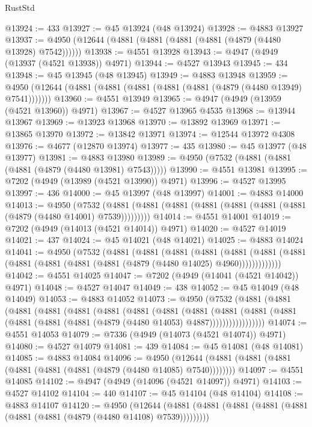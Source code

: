 \begin{lexlean}{RustStd}
\begin{coremodule}
@13924 := 433
@13927 := @45 @13924 (@48 @13924)
@13928 := @4883 @13927
@13937 := @4950 (@12644 (@4881 (@4881 (@4881 (@4881 (@4879 (@4480 @13928) @7542))))))
@13938 := @4551 @13928
@13943 := @4947 (@4949 (@13937 (@4521 @13938)) @4971)
@13944 := @4527 @13943
@13945 := 434
@13948 := @45 @13945 (@48 @13945)
@13949 := @4883 @13948
@13959 := @4950 (@12644 (@4881 (@4881 (@4881 (@4881 (@4881 (@4879 (@4480 @13949) @7541)))))))
@13960 := @4551 @13949
@13965 := @4947 (@4949 (@13959 (@4521 @13960)) @4971)
@13967 := @4527 @13965 @4535
@13968 := @13944 @13967
@13969 := @13923 @13968
@13970 := @13892 @13969
@13971 := @13865 @13970
@13972 := @13842 @13971
@13974 := @12544 @13972 @4308
@13976 := @4677 (@12870 @13974)
@13977 := 435
@13980 := @45 @13977 (@48 @13977)
@13981 := @4883 @13980
@13989 := @4950 (@7532 (@4881 (@4881 (@4881 (@4879 (@4480 @13981) @7543)))))
@13990 := @4551 @13981
@13995 := @7202 (@4949 (@13989 (@4521 @13990)) @4971)
@13996 := @4527 @13995
@13997 := 436
@14000 := @45 @13997 (@48 @13997)
@14001 := @4883 @14000
@14013 := @4950
    (@7532 (@4881 (@4881 (@4881 (@4881 (@4881 (@4881 (@4881 (@4879 (@4480 @14001) @7539)))))))))
@14014 := @4551 @14001
@14019 := @7202 (@4949 (@14013 (@4521 @14014)) @4971)
@14020 := @4527 @14019
@14021 := 437
@14024 := @45 @14021 (@48 @14021)
@14025 := @4883 @14024
@14041 := @4950
    (@7532
      (@4881
        (@4881
          (@4881
            (@4881
              (@4881
                (@4881 (@4881 (@4881 (@4881 (@4881 (@4881 (@4879 (@4480 @14025) @4960)))))))))))))
@14042 := @4551 @14025
@14047 := @7202 (@4949 (@14041 (@4521 @14042)) @4971)
@14048 := @4527 @14047
@14049 := 438
@14052 := @45 @14049 (@48 @14049)
@14053 := @4883 @14052
@14073 := @4950
    (@7532
      (@4881
        (@4881
          (@4881
            (@4881
              (@4881
                (@4881
                  (@4881
                    (@4881
                      (@4881
                        (@4881
                          (@4881
                            (@4881 (@4881 (@4881 (@4881 (@4879 (@4480 @14053) @4887)))))))))))))))))
@14074 := @4551 @14053
@14079 := @7336 (@4949 (@14073 (@4521 @14074)) @4971)
@14080 := @4527 @14079
@14081 := 439
@14084 := @45 @14081 (@48 @14081)
@14085 := @4883 @14084
@14096 := @4950
    (@12644 (@4881 (@4881 (@4881 (@4881 (@4881 (@4881 (@4879 (@4480 @14085) @7540))))))))
@14097 := @4551 @14085
@14102 := @4947 (@4949 (@14096 (@4521 @14097)) @4971)
@14103 := @4527 @14102
@14104 := 440
@14107 := @45 @14104 (@48 @14104)
@14108 := @4883 @14107
@14120 := @4950
    (@12644 (@4881 (@4881 (@4881 (@4881 (@4881 (@4881 (@4881 (@4879 (@4480 @14108) @7539)))))))))

\end{coremodule}
\end{lexlean}
